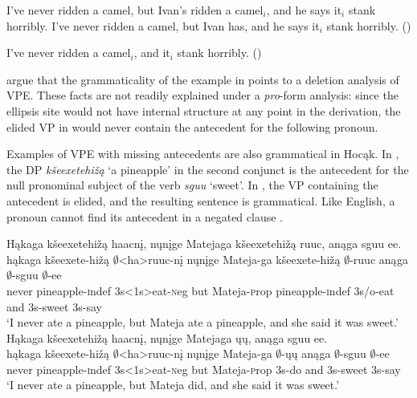 \documentclass[output=paper]{LSP/langsci}
\begin{document}
\ea
\ea\label{ex:johnson:49a}
I've never ridden a camel, but Ivan's ridden a camel$_i$, and he says it$_i$ stank horribly.
\vspace{12pt}
\ex\label{ex:johnson:49b}
I've never ridden a camel, but Ivan has, and he says it$_i$ stank horribly. (\citealt[403]{HankamerSag1976})
\z
\z

\ea\label{ex:johnson:50}
I've never ridden a camel$_i$, and it$_i$ stank horribly. (\citealt[404]{HankamerSag1976})
\z

\citet{HankamerSag1976} argue that the grammaticality of the example in  points to a deletion analysis of VPE. These facts are not readily explained under a \emph{pro}-form analysis: since the ellipsis site would not have internal structure at any point in the derivation, the elided VP in  would never contain the antecedent for the following pronoun. 

Examples of VPE with missing antecedents are also grammatical in Hocąk. In , the DP \emph{kšeexetehižą} `a pineapple' in the second conjunct is the antecedent for the null pronominal subject of the verb \emph{sguu} `sweet'. In , the VP containing the antecedent is elided, and the resulting sentence is grammatical. Like English, a pronoun cannot find its antecedent in a negated clause .

\ea
\ea\label{ex:johnson:51a}
\glll Hąkaga kšeexetehižą haacnį, nųnįge Matejaga kšeexetehižą ruuc, anąga sguu ee.\\
hąkaga kšeexete-hižą $\emptyset$<ha>ruuc-nį nųnįge Mateja-ga kšeexete-hižą $\emptyset$-ruuc anąga $\emptyset$-sguu $\emptyset$-ee\\
never pineapple-{\textsc indef} {\textsc 3s<1s>}eat-{\textsc neg} but Mateja-{\textsc prop} pineapple-{\textsc indef} {\textsc 3s/o}-eat and {\textsc 3s}-sweet {\textsc 3s}-say\\
\trans `I never ate a pineapple, but Mateja ate a pineapple, and she said it was sweet.'
\ex\label{ex:johnson:51b}
\glll Hąkaga kšeexetehižą haacnį, nųnįge Matejaga ųų, anąga sguu ee.\\
hąkaga kšeexete-hižą $\emptyset$<ha>ruuc-nį nųnįge Mateja-ga $\emptyset$-ųų anąga $\emptyset$-sguu $\emptyset$-ee\\
never pineapple-{\textsc indef} {\textsc 3s<1s>}eat-{\textsc neg} but Mateja-{\textsc prop} {\textsc 3s}-do and {\textsc 3s}-sweet {\textsc 3s}-say\\
\trans `I never ate a pineapple, but Mateja did, and she said it was sweet.'
\z
\z
\end{document}
